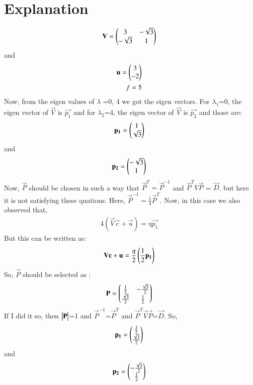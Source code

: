 \documentclass[journal,12pt,twocolumn]{IEEEtran}
\begin{document}
\section{Explanation}

\begin{align}
\mathbf{V} = \begin{pmatrix}3 & -\sqrt{3}\\-\sqrt{3} & 1\end{pmatrix}
\end{align}
and 
\begin{align}
\mathbf{u} = \begin{pmatrix}3 \\ -2\end{pmatrix}\\
f=5
\end{align}
Now, from the eigen values of $\lambda$ =0, 4 we got the eigen vectors. For $\lambda_1$=0, the eigen vector of $\vec{V}$ is $\vec{p_1}$ and for $\lambda_2$=4, the eigen vector of $\vec{V}$ is $\vec{p_2}$ and those are:
\begin{align}
\mathbf{p_1} = \begin{pmatrix}1 \\ \sqrt{3}\end{pmatrix}
\end{align}
and 
\begin{align}
\mathbf{p_2} = \begin{pmatrix}-\sqrt{3} \\ 1\end{pmatrix}
\end{align}
Now,
$\vec{P}$ should be chosen in such a way that $\vec{P}^T = \vec{P}^{-1}$ and 
$\vec{P}^T V \vec{P}$ = $\vec{D}$. but here it is not satisfying these quations. Here, $\vec{P}^{-1} =\frac{1}{4} \vec{P}^T$. Now, in this case we also observed that, 
\begin{align}
4(\vec{V}\vec{c}+\vec{u}) =\eta \vec{p_1}
\end{align}
But this can be written as:
\begin{align}
\mathbf{V}\mathbf{c}+\mathbf{u} =\frac{\eta}{2} \left(\frac{1}{2}\mathbf{p_1}\right)
\end{align}
So, $\vec{P}$ should be selected as :
\begin{align}
\mathbf{P} = \begin{pmatrix}\frac{1}{2} & -\frac{\sqrt{3}}{2}\\\frac{\sqrt{3}}{2} & \frac{1}{2}\end{pmatrix}
\end{align}
If I did it so, then $\begin{vmatrix}\mathbf{P}\end{vmatrix}$=1 and $\vec{P}^{-1}$=$\vec{P}^T$ and $\vec{P}^T \vec{V} \vec{P}$=$\vec{D}$.
So,
\begin{align}
\mathbf{p_1} = \begin{pmatrix}\frac{1}{2} \\ \frac{\sqrt{3}}{2}\end{pmatrix}
\end{align}
and 
\begin{align}
\mathbf{p_2} = \begin{pmatrix}-\frac{\sqrt{3}}{2}\\\frac{1}{2}\end{pmatrix}
\end{align}
\end{document}
